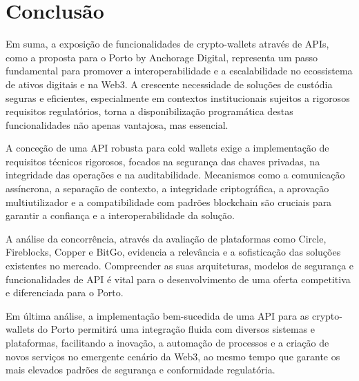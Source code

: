 \newpage
\section{Conclusão}
Em suma, a exposição de funcionalidades de crypto-wallets através de APIs, como a proposta para o Porto by Anchorage Digital, representa um passo fundamental para promover a interoperabilidade e a escalabilidade no ecossistema de ativos digitais e na Web3. A crescente necessidade de soluções de custódia seguras e eficientes, especialmente em contextos institucionais sujeitos a rigorosos requisitos regulatórios, torna a disponibilização programática destas funcionalidades não apenas vantajosa, mas essencial.

A conceção de uma API robusta para cold wallets exige a implementação de requisitos técnicos rigorosos, focados na segurança das chaves privadas, na integridade das operações e na auditabilidade. Mecanismos como a comunicação assíncrona, a separação de contexto, a integridade criptográfica, a aprovação multiutilizador e a compatibilidade com padrões blockchain são cruciais para garantir a confiança e a interoperabilidade da solução.

A análise da concorrência, através da avaliação de plataformas como Circle, Fireblocks, Copper e BitGo, evidencia a relevância e a sofisticação das soluções existentes no mercado. Compreender as suas arquiteturas, modelos de segurança e funcionalidades de API é vital para o desenvolvimento de uma oferta competitiva e diferenciada para o Porto.

Em última análise, a implementação bem-sucedida de uma API para as crypto-wallets do Porto permitirá uma integração fluida com diversos sistemas e plataformas, facilitando a inovação, a automação de processos e a criação de novos serviços no emergente cenário da Web3, ao mesmo tempo que garante os mais elevados padrões de segurança e conformidade regulatória.